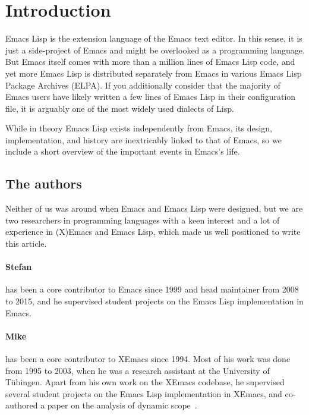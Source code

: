 \documentclass[format=acmsmall, review]{acmart}
\newcommand \Elisp {Emacs Lisp}
\begin{document}
\section{Introduction}

\Elisp{} is the extension language of the Emacs text editor.
In this sense, it is just a side-project of Emacs and might be overlooked as
a programming language.  But Emacs itself comes with more than a million
lines of \Elisp{} code, and yet more \Elisp{} is distributed separately from
Emacs in various Emacs Lisp Package Archives (ELPA).  If you additionally
consider that the majority of Emacs users have likely written a few lines of
\Elisp{} in their configuration file, it is arguably one of the most widely
used dialects of Lisp.

While in theory \Elisp{} exists independently from Emacs, its design,
implementation, and history are inextricably linked to that of Emacs, so we
include a short overview of the important events in Emacs's life.


\subsection{The authors}

Neither of us was around when Emacs and \Elisp{} were designed, but we are
two researchers in programming languages with a keen interest and a lot of
experience in (X)Emacs and \Elisp{}, which made us well positioned to write
this article.

\paragraph{Stefan} has been a core contributor to Emacs since
1999 and head maintainer from 2008 to 2015, and he supervised student
projects on the \Elisp{} implementation in Emacs.

\paragraph{Mike} has been a core contributor to XEmacs since 1994.
Most of his work was done from 1995 to 2003, when he was a research
assistant at the University of Tübingen.  Apart from his own work on
the XEmacs codebase, he supervised several student projects on the
\Elisp{} implementation in XEmacs, and co-authored a paper on the
analysis of dynamic scope~\cite{Neubauer01}.
\end{document}
